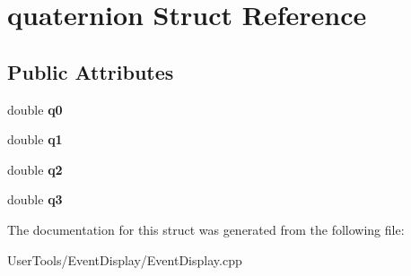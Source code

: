 \hypertarget{structquaternion}{\section{quaternion Struct Reference}
\label{structquaternion}
}
\subsection*{Public Attributes}
\begin{DoxyCompactItemize}
\item 
\hypertarget{structquaternion_a70001dd0b39421c936b6d20e15471b3d}{double {\bfseries q0}}\label{structquaternion_a70001dd0b39421c936b6d20e15471b3d}

\item 
\hypertarget{structquaternion_abbdc170dc2ac800c39fab9aa9f99d3ce}{double {\bfseries q1}}\label{structquaternion_abbdc170dc2ac800c39fab9aa9f99d3ce}

\item 
\hypertarget{structquaternion_a7af6afcba00a35e14ab605b11223b83c}{double {\bfseries q2}}\label{structquaternion_a7af6afcba00a35e14ab605b11223b83c}

\item 
\hypertarget{structquaternion_ad6a829c1635921b61464c75903b71dc8}{double {\bfseries q3}}\label{structquaternion_ad6a829c1635921b61464c75903b71dc8}

\end{DoxyCompactItemize}


The documentation for this struct was generated from the following file\-:\begin{DoxyCompactItemize}
\item 
User\-Tools/\-Event\-Display/Event\-Display.\-cpp\end{DoxyCompactItemize}

